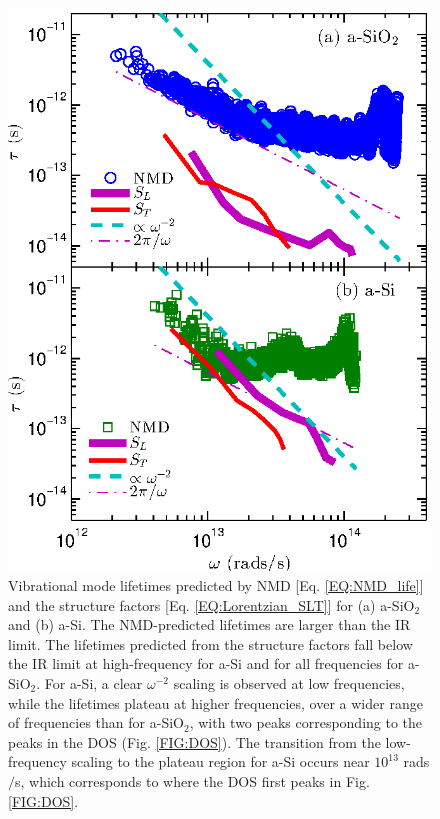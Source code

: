 \documentclass[aps,prb,onecolumn,preprint,superscriptaddress,footinbib,amsmath,amssymb,floatfix]{revtex4}
\begin{document}
\begin{figure}
\begin{center}
\includegraphics[scale=1.0]
{fig4.eps}
\vspace*{-5mm}
\end{center}
\caption{\label{FIG:Lifetimes} Vibrational mode lifetimes predicted by 
NMD [Eq. \eqref{EQ:NMD_life}] and the structure factors 
[Eq. \eqref{EQ:Lorentzian_SLT}] for (a) a-SiO$_2$ and (b) a-Si. 
The NMD-predicted lifetimes are larger than the IR limit.  
The lifetimes predicted from the structure factors 
fall below the IR limit at high-frequency for a-Si and for all 
frequencies for a-SiO$_2$. For a-Si, 
a clear $\omega^{-2}$ scaling is observed at low frequencies, while 
the lifetimes plateau at higher frequencies,
over a wider range of frequencies than for a-SiO$_2$, with two peaks 
corresponding to the peaks in the DOS (Fig. \ref{FIG:DOS}). 
The transition from the low-frequency scaling to 
the plateau region for a-Si occurs near 
$10^{13}$ rads$/$s, which corresponds to where the DOS first peaks 
in Fig. \ref{FIG:DOS}.}
\end{figure}
\end{document}
